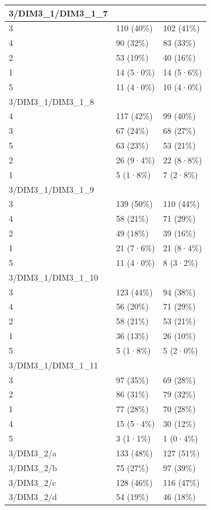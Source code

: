 \documentclass[
]{book}
\begin{document}
\begin{tabular}{l|l|l}
\hline
3/DIM3\_1/DIM3\_1\_7 &  & \\
\hline
3 & 110 (40\%) & 102 (41\%)\\
\hline
4 & 90 (32\%) & 83 (33\%)\\
\hline
2 & 53 (19\%) & 40 (16\%)\\
\hline
1 & 14 (5·0\%) & 14 (5·6\%)\\
\hline
5 & 11 (4·0\%) & 10 (4·0\%)\\
\hline
3/DIM3\_1/DIM3\_1\_8 &  & \\
\hline
4 & 117 (42\%) & 99 (40\%)\\
\hline
3 & 67 (24\%) & 68 (27\%)\\
\hline
5 & 63 (23\%) & 53 (21\%)\\
\hline
2 & 26 (9·4\%) & 22 (8·8\%)\\
\hline
1 & 5 (1·8\%) & 7 (2·8\%)\\
\hline
3/DIM3\_1/DIM3\_1\_9 &  & \\
\hline
3 & 139 (50\%) & 110 (44\%)\\
\hline
4 & 58 (21\%) & 71 (29\%)\\
\hline
2 & 49 (18\%) & 39 (16\%)\\
\hline
1 & 21 (7·6\%) & 21 (8·4\%)\\
\hline
5 & 11 (4·0\%) & 8 (3·2\%)\\
\hline
3/DIM3\_1/DIM3\_1\_10 &  & \\
\hline
3 & 123 (44\%) & 94 (38\%)\\
\hline
4 & 56 (20\%) & 71 (29\%)\\
\hline
2 & 58 (21\%) & 53 (21\%)\\
\hline
1 & 36 (13\%) & 26 (10\%)\\
\hline
5 & 5 (1·8\%) & 5 (2·0\%)\\
\hline
3/DIM3\_1/DIM3\_1\_11 &  & \\
\hline
3 & 97 (35\%) & 69 (28\%)\\
\hline
2 & 86 (31\%) & 79 (32\%)\\
\hline
1 & 77 (28\%) & 70 (28\%)\\
\hline
4 & 15 (5·4\%) & 30 (12\%)\\
\hline
5 & 3 (1·1\%) & 1 (0·4\%)\\
\hline
3/DIM3\_2/a & 133 (48\%) & 127 (51\%)\\
\hline
3/DIM3\_2/b & 75 (27\%) & 97 (39\%)\\
\hline
3/DIM3\_2/c & 128 (46\%) & 116 (47\%)\\
\hline
3/DIM3\_2/d & 54 (19\%) & 46 (18\%)\\

\end{tabular}
\end{document}
